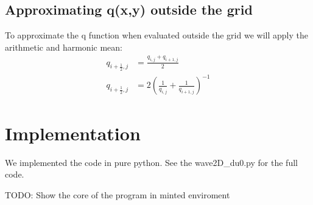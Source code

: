 \documentclass[twoside]{article}
\begin{document}
\subsection{Approximating q(x,y) outside the grid}
To approximate the q function when evaluated outside the grid we will apply the arithmetic and harmonic mean:
\begin{align}
q_{i+\frac{1}{2},j} &= \frac{q_{i,j} + q_{i+1,j}}{2} \label{armean} \\
q_{i+\frac{1}{2},j} &= 2 (\frac{1}{q_{i,j}} + \frac{1}{q_{i+1,j}})^{-1} \label{harmean}
\end{align}











\section{Implementation}
We implemented the code in pure python. See the wave2D\_du0.py for the full code.

TODO: Show the core of the program in minted enviroment
\end{document}
